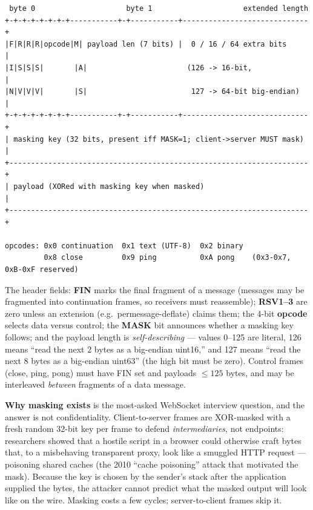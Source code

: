 \begin{verbatim}
 byte 0                     byte 1                     extended length
+-+-+-+-+-+-+-+-----------+-+-----------+-----------------------------+
|F|R|R|R|opcode|M| payload len (7 bits) |  0 / 16 / 64 extra bits     |
|I|S|S|S|       |A|                       (126 -> 16-bit,             |
|N|V|V|V|       |S|                        127 -> 64-bit big-endian)  |
+-+-+-+-+-+-+-+-----------+-+-----------+-----------------------------+
| masking key (32 bits, present iff MASK=1; client->server MUST mask) |
+---------------------------------------------------------------------+
| payload (XORed with masking key when masked)                        |
+---------------------------------------------------------------------+

opcodes: 0x0 continuation  0x1 text (UTF-8)  0x2 binary
         0x8 close         0x9 ping          0xA pong    (0x3-0x7, 0xB-0xF reserved)
\end{verbatim}

The header fields: \textbf{FIN} marks the final fragment of a message
(messages may be fragmented into continuation frames, so receivers must
reassemble); \textbf{RSV1--3} are zero unless an extension (e.g.\
permessage-deflate) claims them; the 4-bit \textbf{opcode} selects data
versus control; the \textbf{MASK} bit announces whether a masking key
follows; and the payload length is \emph{self-describing} --- values 0--125
are literal, 126 means ``read the next 2 bytes as a big-endian uint16,'' and
127 means ``read the next 8 bytes as a big-endian uint63'' (the high bit must
be zero). Control frames (close, ping, pong) must have FIN set and payloads
$\leq 125$ bytes, and may be interleaved \emph{between} fragments of a data
message.

\textbf{Why masking exists} is the most-asked WebSocket interview question,
and the answer is not confidentiality. Client-to-server frames are XOR-masked
with a fresh random 32-bit key per frame to defend \emph{intermediaries}, not
endpoints: researchers showed that a hostile script in a browser could
otherwise craft bytes that, to a misbehaving transparent proxy, look like a
smuggled HTTP request --- poisoning shared caches (the 2010 ``cache
poisoning'' attack that motivated the mask). Because the key is chosen by the
sender's stack after the application supplied the bytes, the attacker cannot
predict what the masked output will look like on the wire. Masking costs a
few cycles; server-to-client frames skip it.


